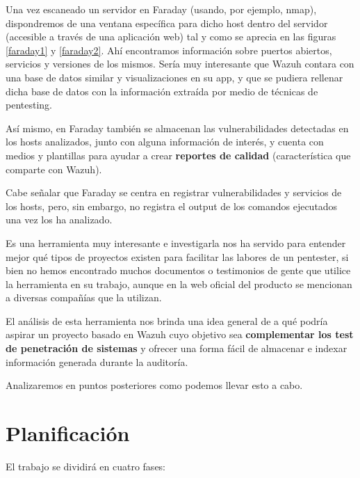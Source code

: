 Una vez escaneado un servidor en Faraday (usando, por ejemplo, nmap), dispondremos de una ventana específica para dicho host dentro del servidor (accesible a través de una aplicación web) tal y como se aprecia en las figuras \ref{faraday1} y \ref{faraday2}. Ahí encontramos información sobre puertos abiertos, servicios y versiones de los mismos. Sería muy interesante que Wazuh contara con una base de datos similar y visualizaciones en su app, y que se pudiera rellenar dicha base de datos con la información extraída por medio de técnicas de pentesting.

Así mismo, en Faraday también se almacenan las vulnerabilidades detectadas en los hosts analizados, junto con alguna información de interés, y cuenta con medios y plantillas para ayudar a crear \textbf{reportes de calidad} (característica que comparte con Wazuh).

Cabe señalar que Faraday se centra en registrar vulnerabilidades y servicios de los hosts, pero, sin embargo, no registra el output de los comandos ejecutados una vez los ha analizado. 

Es una herramienta muy interesante e investigarla nos ha servido para entender mejor qué tipos de proyectos existen para facilitar las labores de un pentester, si bien no hemos encontrado muchos documentos o testimonios de gente que utilice la herramienta en su trabajo, aunque en la web oficial del producto se mencionan a diversas compañías que la utilizan.

El análisis de esta herramienta nos brinda una idea general de a qué podría aspirar un proyecto basado en Wazuh cuyo objetivo sea \textbf{complementar los test de penetración de sistemas} y ofrecer una forma fácil de almacenar e indexar información generada durante la auditoría.

Analizaremos en puntos posteriores como podemos llevar esto a cabo.



\section{Planificación}

El trabajo se dividirá en cuatro fases: 

